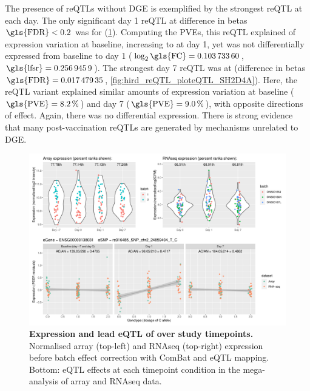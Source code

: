 The presence of \glspl{reQTL} without \gls{DGE} is exemplified by the strongest \gls{reQTL} at each day.
The only significant day 1 \gls{reQTL} at difference in betas $\text{\gls{FDR}} < 0.2$ was for  (\cref{fig:hird_reQTL_ploteQTL_ADCY3}).
Computing the \glspl{PVE}, this \gls{reQTL} explained  of  expression variation at baseline, increasing to  at day 1,
yet  was not differentially expressed from baseline to day 1 ($\log_2\text{\gls{FC}} = \num{0.10373360}$, $\text{\gls{lfsr}}=\num{0.2569459}$).
%
The strongest day 7 \gls{reQTL} was at  
(difference in betas $\text{\gls{FDR}} = \num{0.01747935}$, \cref{fig:hird_reQTL_ploteQTL_SH2D4A}).
Here, the \gls{reQTL} variant explained similar amounts of expression variation at baseline ($\text{\gls{PVE}}=\percentage{0.08229266}$) and day 7 ($\text{\gls{PVE}}=\percentage{0.08956865}$), with opposite directions of effect.
Again, there was no differential expression.
There is strong evidence that many post-vaccination \glspl{reQTL} are generated by mechanisms unrelated to \gls{DGE}.

\begin{figure}
    \centering
    \includegraphics[width=1.0\textwidth,page=1]{mainmatter/figures/chapter_03/plot_dge_eqtl_genotypes.ENSG00000138031,rs916485_SNP_chr2_24859404_T_C.pdf}
    \caption[
    ]{
        \textbf{Expression and lead \gls{eQTL} of  over study timepoints.}
        Normalised array (top-left) and \gls{RNAseq} (top-right) expression before batch effect correction with ComBat and \gls{eQTL} mapping. 
        Bottom: \gls{eQTL} effects at each timepoint condition in the mega-analysis of array and \gls{RNAseq} data.
    }
    \label{fig:hird_reQTL_ploteQTL_ADCY3}
\end{figure}

